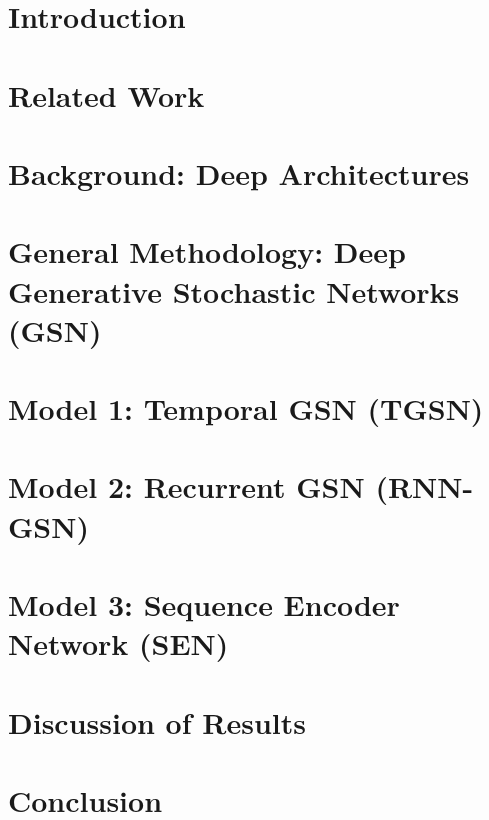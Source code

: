 \documentclass[12pt, titlepage]{report}
\begin{document}
	\tableofcontents
	\listoffigures
	\listoftables
	
	\chapter{Introduction}
	
	
	\chapter{Related Work}
	
	
	\chapter{Background: Deep Architectures}
	
	
	\chapter{General Methodology: Deep Generative Stochastic Networks (GSN)}
	
	
	\chapter{Model 1: Temporal GSN (TGSN)}
	
	
	\chapter{Model 2: Recurrent GSN (RNN-GSN)}	
	

	\chapter{Model 3: Sequence Encoder Network (SEN)}	
	
	
	\chapter{Discussion of Results}
	
	
	\chapter{Conclusion}
	
	
	
	
\end{document}
